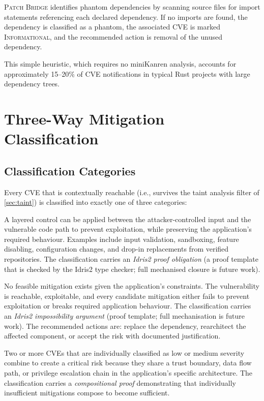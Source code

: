 \documentclass[11pt,twocolumn]{article}
\begin{document}
\textsc{Patch Bridge} identifies phantom dependencies by scanning
source files for import statements referencing each declared
dependency. If no imports are found, the dependency is classified
as a phantom, the associated CVE is marked \textsc{Informational},
and the recommended action is removal of the unused dependency.

This simple heuristic, which requires no miniKanren analysis,
accounts for approximately 15--20\% of CVE notifications in
typical Rust projects with large dependency trees.

\section{Three-Way Mitigation Classification}
\label{sec:classification}

\subsection{Classification Categories}

Every CVE that is contextually reachable (i.e., survives the taint
analysis filter of \cref{sec:taint}) is classified into exactly one
of three categories:

\begin{description}[nosep,leftmargin=1em]
  \item[\textsc{Mitigable}.] A layered control can be applied between
    the attacker-controlled input and the vulnerable code path to
    prevent exploitation, while preserving the application's required
    behaviour. Examples include input validation, sandboxing, feature
    disabling, configuration changes, and drop-in replacements from
    verified repositories. The classification carries an
    \emph{Idris2 proof obligation} (a proof template that is checked by
    the Idris2 type checker; full mechanised closure is future work).
  \item[\textsc{Unmitigable}.] No feasible mitigation exists given the
    application's constraints. The vulnerability is reachable,
    exploitable, and every candidate mitigation either fails to prevent
    exploitation or breaks required application behaviour. The
    classification carries an \emph{Idris2 impossibility argument}
    (proof template; full mechanisation is future work).
    The recommended actions are: replace the dependency, rearchitect
    the affected component, or accept the risk with documented
    justification.
  \item[\textsc{Concatenative}.] Two or more CVEs that are individually
    classified as low or medium severity combine to create a critical
    risk because they share a trust boundary, data flow path, or
    privilege escalation chain in the application's specific
    architecture. The classification carries a \emph{compositional
    proof} demonstrating that individually insufficient mitigations
    compose to become sufficient.
\end{description}
\end{document}
